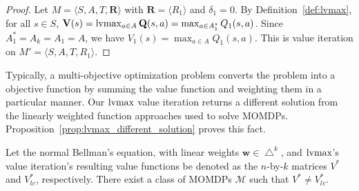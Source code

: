 \begin{proof}
Let $M = \langle S, A, T, \mathbf{R} \rangle$ with $\mathbf{R} = \langle R_1 \rangle$ and $\delta_1 = 0$. By Definition~\ref{def:lvmax}, for all $s \in S$, $\mathbf{V}(s) = \operatorname*{lvmax}_{a \in A} \mathbf{Q}(s, a) = \max_{a \in A_1^*} Q_1(s, a)$. Since $A_1^* = A_k = A_1 = A$, we have $V_1(s) = \max_{a \in A} Q_1(s, a)$. This is value iteration on $M' = \langle S, A, T, R_1 \rangle$.
\end{proof}

Typically, a multi-objective optimization problem converts the problem into a objective function by summing the value function and weighting them in a particular manner. Our $\operatorname*{lvmax}$ value iteration returns a different solution from the linearly weighted function approaches used to solve MOMDPs. Proposition~\ref{prop:lvmax_different_solution} proves this fact.






\begin{proposition}
    \label{prop:lvmax_different_solution}
    Let the normal Bellman's equation, with linear weights $\mathbf{w} \in \bigtriangleup^k$, and $\operatorname*{lvmax}$'s value iteration's resulting value functions be denoted as the $n$-by-$k$ matrices $V^*$ and $V_{lv}^*$, respectively. There exist a class of MOMDPs $\mathcal{M}$ such that $V^* \neq V_{lv}^*$.
\end{proposition}

